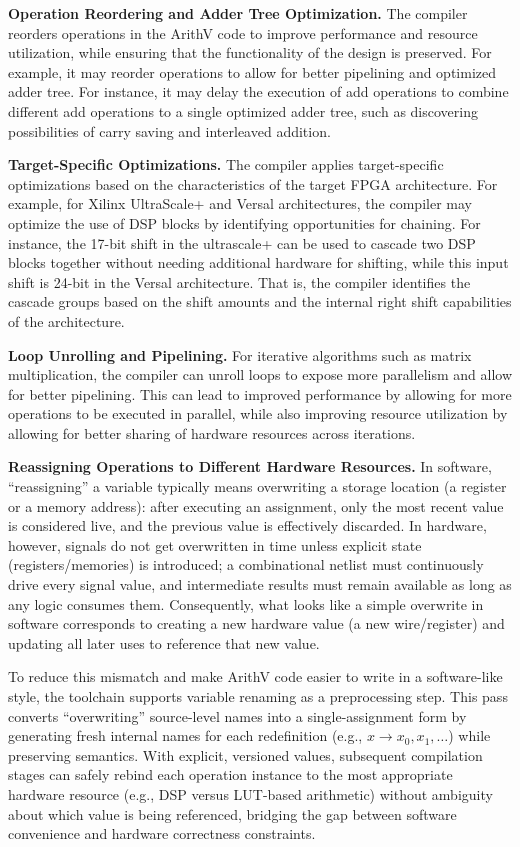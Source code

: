\noindent\textbf{Operation Reordering and Adder Tree Optimization.}
The compiler reorders operations in the ArithV code to improve performance and resource utilization, while ensuring that the functionality of the design is preserved.
For example, it may reorder operations to allow for better pipelining and optimized adder tree.
For instance, it may delay the execution of add operations to combine different add operations to a single optimized adder tree, such as discovering possibilities of carry saving and interleaved addition.

\noindent\textbf{Target-Specific Optimizations.} 
The compiler applies target-specific optimizations based on the characteristics of the target FPGA architecture.
For example, for Xilinx UltraScale+ and Versal architectures, the compiler may optimize the use of DSP blocks by identifying opportunities for chaining. 
For instance, the 17-bit shift in the ultrascale+ can be used to cascade two DSP blocks together without needing additional hardware for shifting, while this input shift is 24-bit in the Versal architecture. 
That is, the compiler identifies the cascade groups based on the shift amounts and the internal right shift capabilities of the architecture. 

\noindent\textbf{Loop Unrolling and Pipelining.}
For iterative algorithms such as matrix multiplication, the compiler can unroll loops to expose more parallelism and allow for better pipelining.
This can lead to improved performance by allowing for more operations to be executed in parallel, while also improving resource utilization by allowing for better sharing of hardware resources across iterations.

\noindent\textbf{Reassigning Operations to Different Hardware Resources.}
In software, ``reassigning'' a variable typically means overwriting a storage location (a register or a memory address): after executing an assignment, only the most recent value is considered live, and the previous value is effectively discarded.
In hardware, however, signals do not get overwritten in time unless explicit state (registers/memories) is introduced; a combinational netlist must continuously drive every signal value, and intermediate results must remain available as long as any logic consumes them.
Consequently, what looks like a simple overwrite in software corresponds to creating a new hardware value (a new wire/register) and updating all later uses to reference that new value.

To reduce this mismatch and make ArithV code easier to write in a software-like style, the toolchain supports variable renaming as a preprocessing step.
This pass converts ``overwriting'' source-level names into a single-assignment form by generating fresh internal names for each redefinition (e.g., $x \rightarrow x_0, x_1, \ldots$) while preserving semantics.
With explicit, versioned values, subsequent compilation stages can safely rebind each operation instance to the most appropriate hardware resource (e.g., DSP versus LUT-based arithmetic) without ambiguity about which value is being referenced, bridging the gap between software convenience and hardware correctness constraints.


